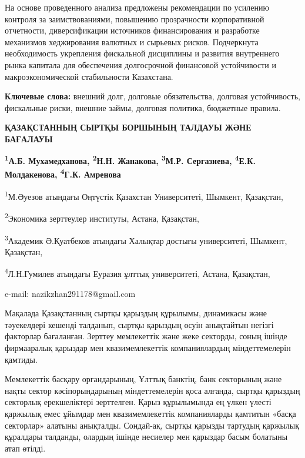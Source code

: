 На основе проведенного анализа предложены рекомендации по усилению
контроля за заимствованиями, повышению прозрачности корпоративной
отчетности, диверсификации источников финансирования и разработке
механизмов хеджирования валютных и сырьевых рисков. Подчеркнута
необходимость укрепления фискальной дисциплины и развития внутреннего
рынка капитала для обеспечения долгосрочной финансовой устойчивости и
макроэкономической стабильности Казахстана.

{\bfseries Ключевые слова:} внешний долг, долговые обязательства, долговая
устойчивость, фискальные риски, внешние займы, долговая политика,
бюджетные правила.

\begin{articleheader}
{\bfseries ҚАЗАҚСТАННЫҢ СЫРТҚЫ БОРШЫНЫҢ ТАЛДАУЫ ЖӘНЕ БАҒАЛАУЫ}

{\bfseries
\textsuperscript{1}А.Б. Мухамедханова,
\textsuperscript{2}Н.Н. Жанакова\textsuperscript{\envelope },
\textsuperscript{3}М.Р. Сергазиева,
\textsuperscript{4}Е.К. Молдакенова,
\textsuperscript{4}Г.К. Амренова
}
\end{articleheader}

\begin{affiliation}
\textsuperscript{1}М.Әуезов атындағы Оңтүстік Қазахстан Университеті, Шымкент, Қазақстан,

\textsuperscript{2}Экономика зерттеулер институты, Астана, Қазақстан,

\textsuperscript{3}Академик Ә.Қуатбеков атындағы Халықтар достығы университеті, Шымкент, Қазақстан,

\textsuperscript{4}Л.Н.Гумилев атындағы Еуразия ұлттық университеті, Астана, Қазақстан,

e-mail: nazikzhan291178@gmail.com
\end{affiliation}

Мақалада Қазақстанның сыртқы қарыздың құрылымы, динамикасы және
тәуекелдері кешенді талданып, сыртқы қарыздың өсуін анықтайтын негізгі
факторлар бағаланған. Зерттеу мемлекеттік және жеке секторды, соның
ішінде фирмааралық қарыздар мен квазимемлекеттік компаниялардың
міндеттемелерін қамтиды.

Мемлекеттік басқару органдарының, Ұлттық банктің, банк секторының және
нақты сектор кәсіпорындарының міндеттемелерін қоса алғанда, сыртқы
қарыздың секторлық ерекшеліктері зерттелген. Қарыз құрылымында ең үлкен
үлесті қаржылық емес ұйымдар мен квазимемлекеттік компанияларды қамтитын
«басқа секторлар» алатыны анықталды. Сондай-ақ, сыртқы қарызды тартудың
қаржылық құралдары талданды, олардың ішінде несиелер мен қарыздар басым
болатыны атап өтілді.

